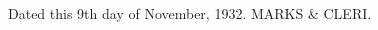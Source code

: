 \documentclass[11pt]{article}
\begin{document}
\begin{multicols*}{2}
\begin{flushright}
Dated this 9th day of November, 1932. 
MARKS & CLERI. 
\end{flushright}




 



 
 

 
 



 

 



 
 
 






 




 










\end{multicols*}
\end{document}
